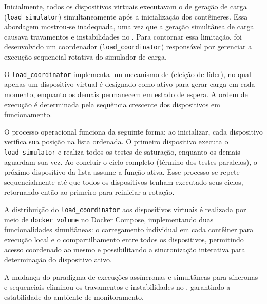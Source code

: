 Inicialmente, todos os dispositivos virtuais executavam o  de geração de carga (\verb|load_simulator|) simultaneamente após a inicialização dos contêineres. Essa abordagem mostrou-se inadequada, uma vez que a geração simultânea de carga causava travamentos e instabilidades no . Para contornar essa limitação, foi desenvolvido um  coordenador (\verb|load_coordinator|) responsável por gerenciar a execução sequencial rotativa do simulador de carga.

O \verb|load_coordinator| implementa um mecanismo de  (eleição de líder), no qual apenas um dispositivo virtual é designado como ativo para gerar carga em cada momento, enquanto os demais permanecem em estado de espera. A ordem de execução é determinada pela sequência crescente dos dispositivos em funcionamento.

O processo operacional funciona da seguinte forma: ao inicializar, cada dispositivo verifica sua posição na lista ordenada. O primeiro dispositivo executa o \verb|load_simulator| e realiza todos os testes de saturação, enquanto os demais aguardam sua vez. Ao concluir o ciclo completo (término dos testes paralelos), o próximo dispositivo da lista assume a função ativa. Esse processo se repete sequencialmente até que todos os dispositivos tenham executado seus ciclos, retornando então ao primeiro para reiniciar a rotação.


A distribuição do \verb|load_coordinator| aos dispositivos virtuais é realizada por meio de \verb|docker volume| no Docker Compose, implementando duas funcionalidades simultâneas: o carregamento individual em cada contêiner para execução local e o compartilhamento entre todos os dispositivos, permitindo acesso coordenado ao mesmo  e possibilitando a sincronização interativa para determinação do dispositivo ativo.

A mudança do paradigma de execuções assíncronas e simultâneas para síncronas e sequenciais eliminou os travamentos e instabilidades no , garantindo a estabilidade do ambiente de monitoramento.


